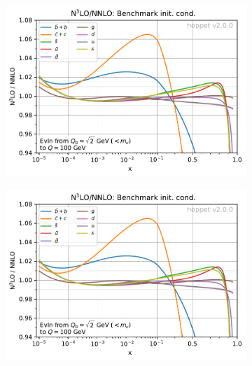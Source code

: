 \begin{figure}[p]
  \centering
  \begin{subfigure}{0.49\textwidth}
    \centering
    \includegraphics[width=\textwidth,page=1]{figs-v2/n3lo_k_factors.pdf}\\[-1.5ex]
    \caption{}
    \label{fig:n3lok-benchmark-mtm}
  \end{subfigure}
  \begin{subfigure}{0.49\textwidth}
    \centering
    \includegraphics[width=\textwidth,page=3]{figs-v2/n3lo_k_factors.pdf}\\[-1.5ex]
    \caption{}
    \label{fig:n3lok-benchmark-nomtm}
  \end{subfigure}\\[1ex]
  \begin{subfigure}{0.49\textwidth}

\end{subfigure}
\end{figure}
